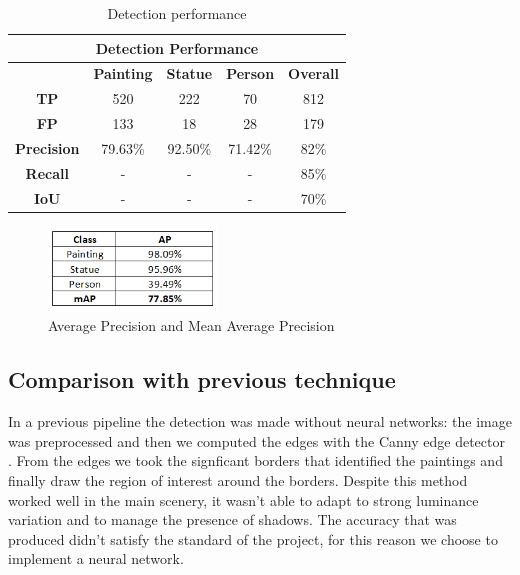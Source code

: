 \begin{table}[ht]
    \centering
    \begin{tabular}{|c|c|c|c|c|}
    \hline
    \multicolumn{5}{|c|}{\textbf{Detection   Performance}}  \\ \hline
    \multicolumn{1}{|l|}{} & \textbf{Painting} & \textbf{Statue} & \textbf{Person} & \textbf{Overall} \\ \hline
    \textbf{TP}        & 520     & 222     & 70      & 812  \\ \hline
    \textbf{FP}        & 133     & 18      & 28      & 179  \\ \hline
    \textbf{Precision} & 79.63\% & 92.50\% & 71.42\% & 82\% \\ \hline
    \textbf{Recall}    & -       & -       & -       & 85\% \\ \hline
    \textbf{IoU}       & -       & -       & -       & 70\% \\ \hline
    \end{tabular}
    \caption{Detection performance}
    \label{tab:detection_performance}
    \end{table}

\begin{figure}[h]
    \centering
        \includegraphics[width=0.4\textwidth]{pictures/painting_detection/tabella2.png}
    \caption{Average Precision and Mean Average Precision}
    \label{fig:figura3}
\end{figure}

\subsection{Comparison with previous technique}
In a previous pipeline the detection was made without neural networks:
the image was preprocessed and then we computed the edges with the Canny edge detector \cite{canny}. From the edges we took the signficant borders that identified the paintings and finally draw the region of interest around the borders. Despite this method worked well in the main scenery, it wasn't able to adapt to strong luminance variation and to manage the presence of shadows.
The accuracy that was produced didn't satisfy the standard of the project, for this reason we choose to implement a neural network.

